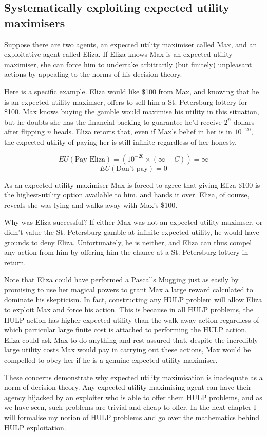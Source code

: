 \documentclass{article}
\begin{document}
\subsection{Systematically exploiting expected utility maximisers}

Suppose there are two agents, an expected utility maximiser called Max, and an exploitative agent called Eliza. If Eliza knows Max is an expected utility maximiser, she can force him to undertake arbitrarily (but finitely) unpleasant actions by appealing to the norms of his decision theory. 

Here is a specific example. Eliza would like \$100 from Max, and knowing that he is an expected utility maximser, offers to sell him a St. Petersburg lottery for \$100. Max knows buying the gamble would maximise his utility in this situation, but he doubts she has the financial backing to guarantee he'd receive \(2^n\) dollars after flipping \(n\) heads. Eliza retorts that, even if Max's belief in her is in \(10^{-20}\), the expected utility of paying her is still infinite regardless of her honesty.

\[EU(\mbox{Pay Eliza})=(10^{-20}\times(\infty-C)) = \infty\]
\[EU(\mbox{Don't pay})=0\]

As an expected utility maximiser Max is forced to agree that giving Eliza \$100 is the highest-utility option available to him, and hands it over. Eliza, of course, reveals she was lying and walks away with Max's \$100.

Why was Eliza successful? If either Max was not an expected utility maximser, or didn't value the St. Petersburg gamble at infinite expected utility, he would have grounds to deny Eliza. Unfortunately, he is neither, and Eliza can thus compel any action from him by offering him the chance at a St. Petersburg lottery in return. 

Note that Eliza could have performed a Pascal's Mugging just as easily by promising to use her magical powers to grant Max a large reward calculated to dominate his skepticism. In fact, constructing any HULP problem will allow Eliza to exploit Max and force his action. This is because in all HULP problems, the HULP action has higher expected utility than the walk-away action regardless of which particular large finite cost is attached to performing the HULP action. Eliza could ask Max to do anything and rest assured that, despite the incredibly large utility costs Max would pay in carrying out these actions, Max would be compelled to obey her if he is a genuine expected utility maximiser.

These concerns demonstrate why expected utility maximisation is inadequate as a norm of decision theory. Any expected utility maximising agent can have their agency hijacked by an exploiter who is able to offer them HULP problems, and as we have seen, such problems are trivial and cheap to offer. In the next chapter I will formalise my notion of HULP problems and go over the mathematics behind HULP exploitation.


\end{document}
